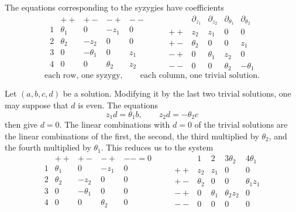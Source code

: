 \documentclass[11pt]{article}
\begin{document}
The equations corresponding to the syzygies have coefficients
\[
\begin{array}{c|cccc}
& ++ & +- & -+ & --\\ \hline
1& \theta_1&0&-z_1&0\\
2& \theta_2&-z_2&0&0\\
3&0&-\theta_1&0&z_1\\
4&0&0&\theta_2&z_2
\end{array}
\qquad
\begin{array}{c|cccc}
& \partial_{z_1}&\partial_{z_2}&\partial_{\theta_1}&\partial_{\theta_2}\\ \hline
++& z_2&z_1&0&0\\
+-& \theta_2&0&0&z_1\\
-+&0&\theta_1&z_2&0\\
--&0&0&\theta_2&-\theta_1
\end{array}
\]
\[
\text{each row, one syzygy},\qquad
\text{each column, one trivial solution}.
\]

Let $(a,b,c,d)$ be a solution. Modifying it by the last two trivial solutions, one may suppose that $d$ is even. The equations
\[
  z_1d=\theta_1 b,
  \qquad
  z_2d=-\theta_2 c
\]
then give $d=0$. The linear combinations with $d=0$ of the trivial solutions are the linear combinations of the first, the second, the third multiplied by $\theta_2$, and the fourth multiplied by $\theta_1$. This reduces us to the system
\[
\begin{array}{c|cccc}
& ++&+-&-+&--=0\\ \hline
1&\theta_1&0&-z_1&0\\
2&\theta_2&-z_2&0&0\\
3&0&-\theta_1&0&0\\
4&0&0&\theta_2&0
\end{array}
\qquad
\begin{array}{c|cccc}
&1&2&3\theta_2&4\theta_1\\ \hline
++&z_2&z_1&0&0\\
+-&\theta_2&0&0&\theta_1z_1\\
-+&0&\theta_1&\theta_2z_2&0\\
--&0&0&0&0
\end{array}
\]
\end{document}
